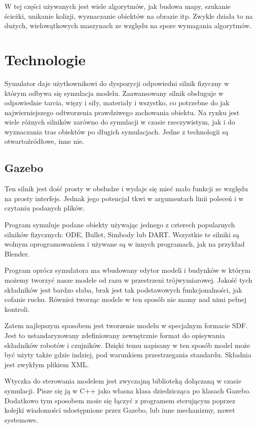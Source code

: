  W tej części używanych jest wiele algorytmów, jak budowa mapy, szukanie ścieżki, unikanie kolizji, wyznaczanie obiektów na obrazie itp.
 Zwykle działa to na dużych, wielowątkowych maszynach ze względu na spore wymagania algorytmów.

\section{Technologie}
Symulator daje użytkownikowi do dyspozycji odpowiedni silnik fizyczny w którym odbywa się symulacja modelu.
Zaawansowany silnik obsługuje w odpowiednie tarcia, więzy i siły, materiały i wszystko, co potrzebne do jak najwierniejszego odtworzenia prawdziwego zachowania obiektu.
Na rynku jest wiele różnych silników zarówno do symulacji w czasie rzeczywistym, jak i do wyznaczania tras obiektów po długich symulacjach.
Jedne z technologii są otwartoźródłowe, inne nie.

\subsection{Gazebo}
Ten silnik jest dość prosty w obsłudze i wydaje się mieć mało funkcji ze względu na prosty interfejs.
Jednak jego potencjał tkwi w argumentach linii poleceń i w czytaniu podanych plików.

Program symuluje podane obiekty używając jednego z czterech popularnych silników fizycznych: ODE, Bullet, Simbody lub DART.
Wszystkie te silniki są wolnym oprogramowaniem i używane są w innych programach, jak na przykład Blender.

Program oprócz symulatora ma wbudowany edytor modeli i budynków w którym możemy tworzyć nasze modele od razu w przestrzeni trójwymiarowej.
Jakość tych składników jest bardzo słaba, brak jest tak podstawowych funkcjonalności, jak cofanie ruchu.
Również tworząc modele w ten sposób nie mamy nad nimi pełnej kontroli.

Zatem najlepszym sposobem jest tworzenie modelu w specjalnym formacie SDF. Jest to ustandaryzowany zdefiniowany zewnętrznie format do opisywania składników robotów i czujników.
Dzięki temu napisany w ten sposób model może być użyty także gdzie indziej, pod warunkiem przestrzegania standardu.
Składnia jest zwykłym plikiem XML.

Wtyczka do sterowania modelem jest zwyczajną biblioteką dołączaną w czasie symulacji. 
Pisze się ją w C++ jako własna klasa dziedzicząca po klasach Gazebo.
Dodatkowo tym sposobem może się łączyć z programem sterującym poprzez kolejki wiadomości udostępnione przez Gazebo, lub inne mechanizmy, nawet systemowe.

